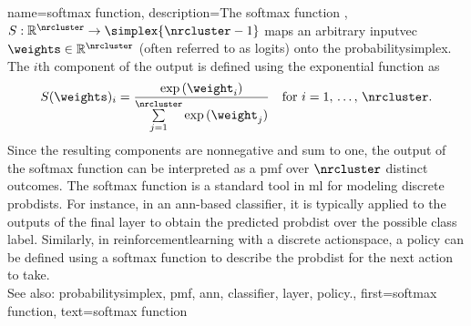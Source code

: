{name={softmax function},
	description={The softmax \gls{function} \cite{bridle1989training}, \cite{bridle1990probabilistic}
		$S: \mathbb{R}^\nrcluster \rightarrow \simplex{\nrcluster-1}$ maps an 
		arbitrary \gls{inputvec} $\weights \in \mathbb{R}^\nrcluster$ (often referred to as logits) 
		onto the \gls{probabilitysimplex}. The $i$th component of the output is defined using 
		the exponential \gls{function} as
		\begin{equation}\label{eq:softmax_function_dict}
			\nonumber
			S(\weights)_i 
            =   \frac{\exp\,(\weight_i)}{\sum\limits_{j=1}^{\nrcluster} \exp\,(\weight_j)} \quad \text{for } i=1,\,\ldots,\,\nrcluster.
		\end{equation}
		Since the resulting components are nonnegative and sum to one, the output of the 
		softmax \gls{function} can be interpreted as a \gls{pmf} over $\nrcluster$ distinct \glspl{outcome}.
		The softmax \gls{function} is a standard tool in \gls{ml} for modeling discrete \glspl{probdist}. 
		For instance, in an \gls{ann}-based \gls{classifier}, it is typically applied 
		to the \glspl{output} of the final \gls{layer} to obtain the predicted \gls{probdist} over the possible class \gls{label}. 
		Similarly, in \gls{reinforcementlearning} with a discrete 
		\gls{actionspace}, a \gls{policy} can be defined using a softmax \gls{function} to 
		describe the \gls{probdist} for the next \gls{action} to take.
		\\
		See also: \gls{probabilitysimplex}, \gls{pmf}, \gls{ann}, \gls{classifier}, \gls{layer}, \gls{policy}.},
	first={softmax function},
	text={softmax function}
}

